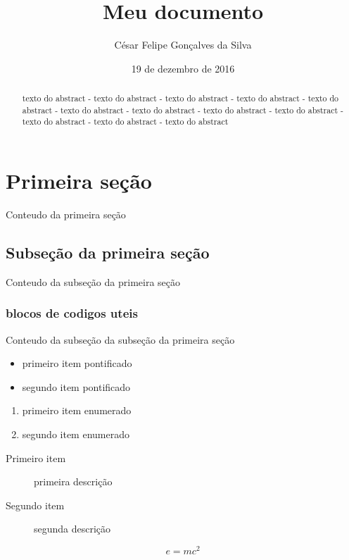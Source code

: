 \documentclass[12pt,a4paper]{article}
\title{Meu documento}
\author{César Felipe Gonçalves da Silva}
\date{19 de dezembro de 2016}
\begin{document}

\begin{abstract}
texto do abstract - texto do abstract - texto do abstract - texto do abstract - texto do abstract - texto do abstract - texto do abstract - texto do abstract - texto do abstract - texto do abstract - texto do abstract - texto do abstract
\end{abstract}

\section{Primeira seção}
Conteudo da primeira seção

\subsection{Subseção da primeira seção}
Conteudo da subseção da primeira seção

\subsubsection{blocos de codigos uteis}
Conteudo da subseção da subseção da primeira seção

\begin{itemize}
\item primeiro item pontificado
\item segundo item pontificado
\end{itemize}

\begin{enumerate}
\item primeiro item enumerado
\item segundo item enumerado
\end{enumerate}

\begin{description}
\item[Primeiro item] primeira descrição
\item[Segundo item] segunda descrição
\end{description}

\begin{equation}
e = mc^2
\end{equation}
\end{document}
